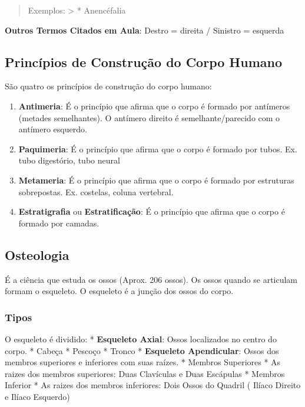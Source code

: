 \documentclass[
]{book}
\providecommand{\tightlist}{%
  \setlength{\itemsep}{0pt}\setlength{\parskip}{0pt}}
\begin{document}
\begin{quote}
Exemplos:
\textgreater{} * Anencéfalia
\end{quote}

\textbf{Outros Termos Citados em Aula}: Destro = direita / Sinistro = esquerda

\hypertarget{princuxedpios-de-construuxe7uxe3o-do-corpo-humano}{%
\subsection{Princípios de Construção do Corpo Humano}\label{princuxedpios-de-construuxe7uxe3o-do-corpo-humano}}

São quatro os princípios de construção do corpo humano:

\begin{enumerate}
\def\labelenumi{\arabic{enumi}.}
\tightlist
\item
  \textbf{Antimeria}: É o princípio que afirma que o corpo é formado por antímeros (metades semelhantes). O antímero direito é semelhante/parecido com o antímero esquerdo.
\item
  \textbf{Paquimeria}: É o princípio que afirma que o corpo é formado por tubos. Ex. tubo digestório, tubo neural
\item
  \textbf{Metameria}: É o princípio que afirma que o corpo é formado por estruturas sobrepostas. Ex. costelas, coluna vertebral.
\item
  \textbf{Estratigrafia} ou \textbf{Estratificação}: É o princípio que afirma que o corpo é formado por camadas.
\end{enumerate}

\hypertarget{osteologia}{%
\subsection{Osteologia}\label{osteologia}}

É a ciência que estuda os ossos (Aprox. 206 ossos). Os ossos quando se articulam formam o esqueleto. O esqueleto é a junção dos ossos do corpo.

\hypertarget{tipos}{%
\subsubsection{Tipos}\label{tipos}}

O esqueleto é dividido:
* \textbf{Esqueleto Axial}: Ossos localizados no centro do corpo.
* Cabeça
* Pescoço
* Tronco
* \textbf{Esqueleto Apendicular}: Ossos dos membros superiores e inferiores com suas raízes.
* Membros Superiores
* As raizes dos membros superiores: Duas Clavículas e Duas Escápulas
* Membros Inferior
* As raizes dos membros inferiores: Dois Ossos do Quadril ( Ilíaco Direito e Ilíaco Esquerdo)
\end{document}
